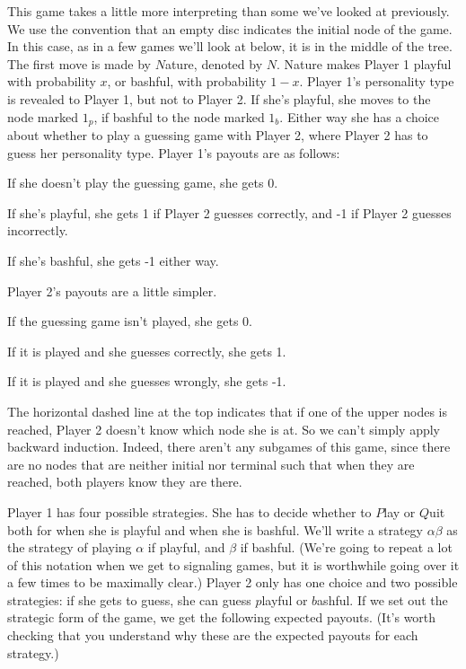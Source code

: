 \noindent This game takes a little more interpreting than some we've looked at previously. We use the convention that an empty disc indicates the initial node of the game. In this case, as in a few games we'll look at below, it is in the middle of the tree. The first move is made by $N$ature, denoted by $N$. Nature makes Player 1 playful with probability $x$, or bashful, with probability $1-x$. Player 1's personality type is revealed to Player 1, but not to Player 2. If she's playful, she moves to the node marked $1_p$, if bashful to the node marked $1_b$. Either way she has a choice about whether to play a guessing game with Player 2, where Player 2 has to guess her personality type. Player 1's payouts are as follows:

\begin{itemize*}
\item If she doesn't play the guessing game, she gets 0.
\item If she's playful, she gets 1 if Player 2 guesses correctly, and -1 if Player 2 guesses incorrectly.
\item If she's bashful, she gets -1 either way.
\end{itemize*}

\noindent Player 2's payouts are a little simpler.

\begin{itemize*}
\item If the guessing game isn't played, she gets 0.
\item If it is played and she guesses correctly, she gets 1.
\item If it is played and she guesses wrongly, she gets -1.
\end{itemize*}

\noindent The horizontal dashed line at the top indicates that if one of the upper nodes is reached, Player 2 doesn't know which node she is at. So we can't simply apply backward induction. Indeed, there aren't any subgames of this game, since there are no nodes that are neither initial nor terminal such that when they are reached, both players know they are there.

Player 1 has four possible strategies. She has to decide whether to $P$lay or $Q$uit both for when she is playful and when she is bashful. We'll write a strategy $\alpha \beta$ as the strategy of playing $\alpha$ if playful, and $\beta$ if bashful. (We're going to repeat a lot of this notation when we get to signaling games, but it is worthwhile going over it a few times to be maximally clear.) Player 2 only has one choice and two possible strategies: if she gets to guess, she can guess $p$layful or $b$ashful. If we set out the strategic form of the game, we get the following expected payouts. (It's worth checking that you understand why these are the expected payouts for each strategy.)


